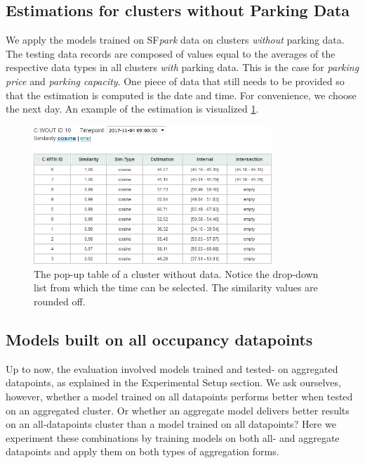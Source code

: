 \documentclass{ws-ijait}
\newcommand{\cmmnt}[1]{\ignorespaces}
\begin{document}
	\subsection{Estimations for clusters without Parking Data}
	We apply the models trained on SF\textit{park} data on clusters \textit{without} parking data.
	The testing data records are composed of values equal to the averages of the respective data types in all clusters \textit{with} parking data.
	This is the case for \textit{parking price} and \textit{parking capacity}.
	One piece of data that still needs to be provided so that the estimation is computed is the date and time.
	For convenience, we choose the next day.
	An example of the estimation is visualized \cref{fig:cwout_table}.
	
	\begin{figure}[!ht]
		\centering
		\includegraphics[width=0.8\textwidth]{../graphics/cwout_cosine_table.png}
		\caption{The pop-up table of a cluster without data.
			Notice the drop-down list from which the time can be selected. The similarity values are rounded off. }
		\label{fig:cwout_table}
	\end{figure}
	
	\subsection{Models built on all occupancy datapoints}
	Up to now, the evaluation involved models trained and tested- on aggregated datapoints, as explained in \cmmnt{\cref{experimental_setup:aggregating_training_data}} the Experimental Setup section. We ask ourselves, however, whether a model trained on all datapoints performs better when tested on an aggregated cluster. Or whether an aggregate model delivers better results on an all-datapoints cluster than a model trained on all datapoints? Here we experiment these combinations by training models on both all- and aggregate datapoints and apply them on both types of aggregation forms. 
	
\end{document}
